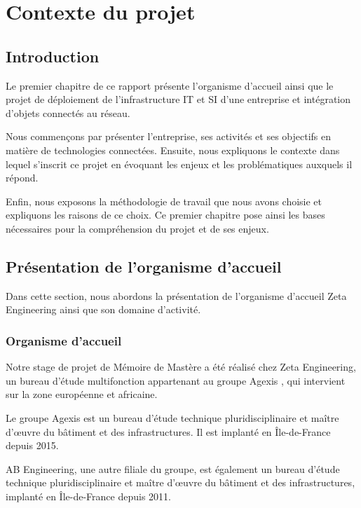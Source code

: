 \chapter{Contexte du projet}

\section{Introduction}
Le premier chapitre de ce rapport présente l'organisme d'accueil ainsi que le projet de déploiement de l'infrastructure IT et SI d'une entreprise et intégration d'objets connectés au réseau.

Nous commençons par présenter l'entreprise, ses activités et ses objectifs en matière de technologies connectées. Ensuite, nous expliquons le contexte dans lequel s'inscrit ce projet en évoquant les enjeux et les problématiques auxquels il répond.

Enfin, nous exposons la méthodologie de travail que nous avons choisie et expliquons les raisons de ce choix. Ce premier chapitre pose ainsi les bases nécessaires pour la compréhension du projet et de ses enjeux.

\section{Présentation de l'organisme d'accueil }

Dans cette section, nous abordons la présentation de l'organisme d'accueil Zeta Engineering ainsi que son domaine d'activité.

\subsection{Organisme d'accueil}

Notre stage de projet de Mémoire de Mastère a été réalisé chez Zeta Engineering, un bureau d'étude multifonction appartenant au groupe Agexis \cite{agexis}, qui intervient sur la zone européenne et africaine. 

Le groupe Agexis est un bureau d'étude technique pluridisciplinaire et maître d'œuvre du bâtiment et des infrastructures. Il est implanté en Île-de-France depuis 2015. 

AB Engineering, une autre filiale du groupe, est également un bureau d'étude technique pluridisciplinaire et maître d'œuvre du bâtiment et des infrastructures, implanté en Île-de-France depuis 2011.


